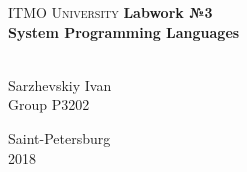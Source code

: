 \begin{titlepage}
\begin{center}

\textsc{ITMO University}
\vfill
\textbf{Labwork №3\\[4mm]
System Programming Languages}\\[16mm]
\begin{flushright}
~\\[2mm]Sarzhevskiy Ivan
~\\[2mm]Group P3202
\end{flushright}
\vfill
Saint-Petersburg\\[2mm]
2018

\end{center}
\end{titlepage}
